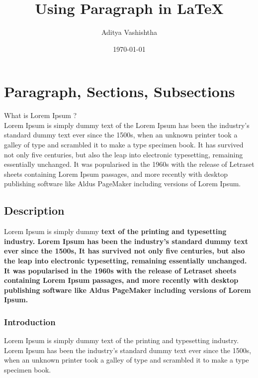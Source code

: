 \documentclass[12pt]{report}
\author{Aditya Vashishtha}
\title{Using Paragraph in \LaTeX}
\date{\today}
\begin{document}
\Large \bf

\maketitle

\tableofcontents

\chapter{Paragraph, Sections, Subsections}
What is Lorem Ipsum ?
\\

\rm \large
\Large \color{orangeShade}
Lorem Ipsum is simply dummy text of the   \rm Lorem Ipsum has been the industry's standard dummy text ever since the 1500s, when an unknown printer took a galley of type and scrambled it to make a type specimen book. It has survived not only five centuries, but also the leap into electronic typesetting, remaining essentially unchanged. It was popularised in the 1960s with the release of Letraset sheets containing Lorem Ipsum passages, and more recently with desktop publishing software like Aldus PageMaker including versions of Lorem Ipsum.
\color{black}

\section{Description}
\color{orangeShade}
Lorem Ipsum is simply dummy \cal \bf {text of the printing and typesetting industry.} \rm Lorem Ipsum has been the industry's standard dummy text ever since the 1500s, It has survived not only five centuries, but also the leap into electronic typesetting, remaining essentially unchanged. It was popularised in the 1960s with the release of Letraset sheets containing Lorem Ipsum passages, and more recently with desktop publishing software like Aldus PageMaker including versions of Lorem Ipsum.
\color{black}

\subsection{Introduction}
\color{orangeShade}
Lorem Ipsum is simply dummy text of the printing and typesetting industry. Lorem Ipsum has been the industry's standard dummy text ever since the 1500s, when an unknown printer took a galley of type and scrambled it to make a type specimen book.
\color{black}
\end{document}
